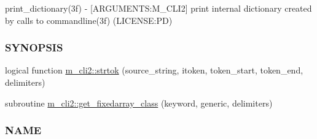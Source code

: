 \begin{DoxyCompactItemize}
\begin{DoxyCompactList}
print\+\_\+dictionary(3f) -\/ \mbox{[}A\+R\+G\+U\+M\+E\+N\+TS\+:M\+\_\+\+C\+L\+I2\mbox{]} print internal dictionary created by calls to commandline(3f) (L\+I\+C\+E\+N\+SE\+:PD) \subsubsection*{S\+Y\+N\+O\+P\+S\+IS}\end{DoxyCompactList}\item 
logical function \mbox{\hyperlink{namespacem__cli2_a752fd074abce57e636e4572b3e55db3a}{m\+\_\+cli2\+::strtok}} (source\+\_\+string, itoken, token\+\_\+start, token\+\_\+end, delimiters)
\item 
subroutine \mbox{\hyperlink{namespacem__cli2_a6d8c1c441ac15f9a2882e50459d39565}{m\+\_\+cli2\+::get\+\_\+fixedarray\+\_\+class}} (keyword, generic, delimiters)
\begin{DoxyCompactList}\small\item\em \subsubsection*{N\+A\+ME}


\end{DoxyCompactList}
\end{DoxyCompactItemize}
